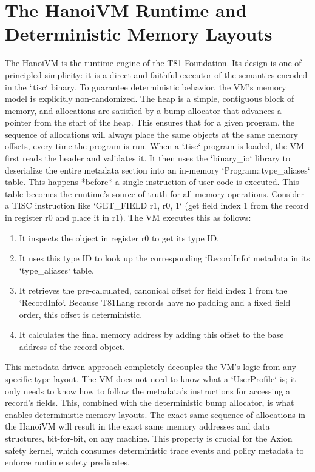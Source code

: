 \documentclass[sigconf, 10pt]{acmart}
\begin{document}
\section{The HanoiVM Runtime and Deterministic Memory Layouts}
The HanoiVM is the runtime engine of the T81 Foundation. Its design is one of principled simplicity: it is a direct and faithful executor of the semantics encoded in the `.tisc` binary. To guarantee deterministic behavior, the VM's memory model is explicitly non-randomized. The heap is a simple, contiguous block of memory, and allocations are satisfied by a bump allocator that advances a pointer from the start of the heap. This ensures that for a given program, the sequence of allocations will always place the same objects at the same memory offsets, every time the program is run.
When a `.tisc` program is loaded, the VM first reads the header and validates it. It then uses the `binary_io` library to deserialize the entire metadata section into an in-memory `Program::type_aliases` table. This happens *before* a single instruction of user code is executed. This table becomes the runtime's source of truth for all memory operations. Consider a TISC instruction like `GET_FIELD r1, r0, 1` (get field index 1 from the record in register r0 and place it in r1). The VM executes this as follows:
\begin{enumerate}
\item It inspects the object in register r0 to get its type ID.
\item It uses this type ID to look up the corresponding `RecordInfo` metadata in its `type_aliases` table.
\item It retrieves the pre-calculated, canonical offset for field index 1 from the `RecordInfo`. Because T81Lang records have no padding and a fixed field order, this offset is deterministic.
\item It calculates the final memory address by adding this offset to the base address of the record object.
\end{enumerate}
This metadata-driven approach completely decouples the VM's logic from any specific type layout. The VM does not need to know what a `UserProfile` is; it only needs to know how to follow the metadata's instructions for accessing a record's fields. This, combined with the deterministic bump allocator, is what enables deterministic memory layouts. The exact same sequence of allocations in the HanoiVM will result in the exact same memory addresses and data structures, bit-for-bit, on any machine. This property is crucial for the Axion safety kernel, which consumes deterministic trace events and policy metadata to enforce runtime safety predicates.
\end{document}
